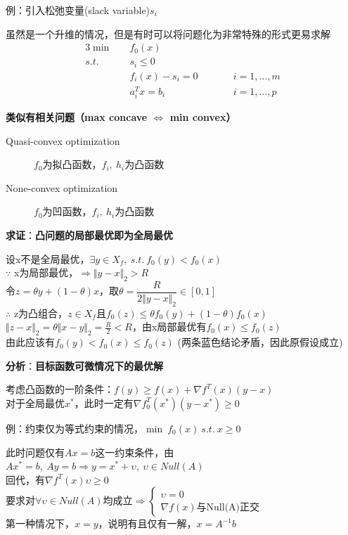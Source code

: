 \documentclass[11pt]{ctexart}         %
\newcommand{\rebacklinespread}[1][-12pt]{\vspace{#1}}
\newcommand{\oneline}[1][12pt]{\vspace{#1}}
\newcommand{\linearcombine}[2]{\theta #1+(1-\theta)#2}
\newcommand{\bc}[1]{\begin{cases}#1\end{cases}}
\newcommand{\li}[3][例]{
	#1：#2\\ 
	\phantom{#1：}\begin{minipage}[t]{0.9\linewidth}%
	\setlength\parskip{12pt}
	#3
	\end{minipage}
	\oneline}
\newcommand{\paint}[2][red]{{\color{#1}#2}} %
\begin{document}
\newpage
\li{引入松弛变量(slack variable)$ s_i $}{
	虽然是一个升维的情况，但是有时可以将问题化为非常特殊的形式更易求解
	\rebacklinespread
	\begin{alignat*}{3}%
		\min\quad &f_0(x)		&&\\
		s.t.\quad &s_i\leq 0    &&\\
				  &f_i(x)-s_i=0 &&\qquad i=1,\dots,m \\
				  &a_i^Tx=b_i	&&\qquad i=1,\dots,p 
	\end{alignat*}
}

\textbf{类似有相关问题（max concave $\Leftrightarrow$ min convex）}
\rebacklinespread
\begin{description}
	\item[Quasi-convex optimization] $ f_0 $为拟凸函数，$ f_i,\ h_i $为凸函数
	\item[None-convex optimization] $ f_0 $为凹函数，$ f_i,\ h_i $为凸函数
\end{description}

\li[\textbf{求证}]{\textbf{凸问题的局部最优即为全局最优}}{
	设x不是全局最优，$\exists y\in X_f,\ s.t.\ f_0(y)<f_0(x)$\\
	$\because$ x为局部最优，$\Rightarrow \Vert y-x\Vert_2>R$\\
	令$ z=\linearcombine{y}{x} $，取$ \theta=\dfrac{R}{2\Vert y-x\Vert_2}\in [0,1] $\\[6pt]
	$\therefore$ z为凸组合，$ z\in X_f $且\paint[blue]{$ f_0(z)\leq \linearcombine{f_0(y)}{f_0(x)} $}\\
	$ \Vert z-x\Vert_2=\theta \Vert x-y\Vert_2=\frac{R}{2}<R $，由x局部最优有$ f_0(x)\leq f_0(z) $\\
	由此应该有\paint[blue]{$ f_0(y)<f_0(x)\leq f_0(z) $}  (两条蓝色结论矛盾，因此原假设成立)
}

\li[\textbf{分析}]{\textbf{目标函数可微情况下的最优解}}{
	考虑凸函数的一阶条件：$ f(y)\geq f(x)+\nabla f^T(x)(y-x) $\\
	对于全局最优$ x^* $，此时一定有$ \nabla f^T_0(x^*)(y-x^*)\geq 0 $
}

\li{约束仅为等式约束的情况，$ \min\ f_0(x)\ s.t.\ x\geq 0 $}{
	此时问题仅有$ Ax=b $这一约束条件，由$ Ax^*=b,\ Ay=b \Rightarrow y=x^*+\upsilon,\ \upsilon\in Null(A)$\\
	回代，有$ \nabla f^T(x)\upsilon\geq 0 $\\
	要求对$ \forall\upsilon\in Null(A) \text{均成立}\Rightarrow\bc{\upsilon=0\\ \nabla f(x)\text{与Null(A)正交}}$\\ [6pt]
	第一种情况下，$ x=y $，说明有且仅有一解，$ x=A^{-1}b $
}
\end{document}
